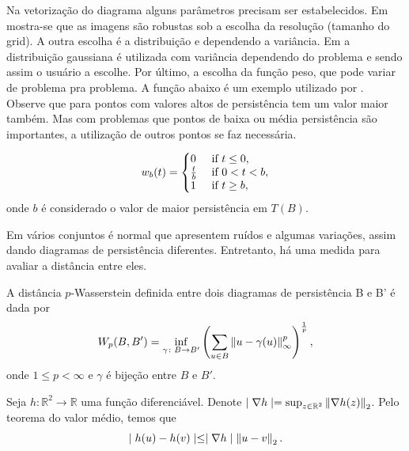Na vetorização do diagrama alguns parâmetros precisam ser estabelecidos. Em \cite{Adams2017} mostra-se que
as imagens são robustas sob a escolha da resolução (tamanho do grid). A outra escolha é a distribuição e dependendo
a variância. Em \cite{Adams2017} a distribuição gaussiana é utilizada com variância dependendo do problema e 
sendo assim o usuário a escolhe. Por último, a escolha da função peso, que pode variar de problema pra problema.
A função abaixo é um exemplo utilizado por \cite{Adams2017}. Observe que para pontos com valores altos de 
persistência tem um valor maior também. Mas com problemas que pontos de baixa ou média persistência são importantes,
a utilização de outros pontos se faz necessária. 

\begin{equation}\label{eq:weightfunct}
    w_b(t) = \left\{
             \begin{array}{@{}ll@{}} 
                 0           & \text{ if } t \leq 0, \\
                 \frac{t}{b} & \text{ if } 0 < t < b, \\
                 1           & \text{ if } t \geq b, 
             \end{array}\right.
\end{equation}
onde $b$ é considerado o valor de maior persistência em $T(B)$.

Em vários conjuntos é normal que apresentem ruídos e algumas variações, assim dando diagramas de persistência
diferentes. Entretanto, há uma medida para avaliar a distância entre eles. 
\begin{defi}
    A distância $p$-Wasserstein definida entre dois diagramas de persistência B e B' é dada por 
    \begin{equation*}
        W_p(B,B') = \inf_{\gamma\colon B \to B'} \left( \sum_{u\in B} \left\lVert u - \gamma(u)\right\rVert_{\infty}^{p} 
                    \right)^\frac{1}{p},
    \end{equation*}
    onde $1 \leq p < \infty$ e $\gamma$ é bijeção entre $B$ e $B'$. 
\end{defi}

Seja $h\colon \mathbb{R}^2 \to \mathbb{R}$ uma função diferenciável. Denote 
$\mid \nabla h \mid = \sup_{z\in \mathbb{R}^2} \left\lVert\nabla h(z)\right\rVert_2$. Pelo teorema do valor médio, temos que 
\begin{equation}\label{eq:mean_val}
    \mid h(u) - h(v) \mid \leq \mid \nabla h \mid \left\lVert u-v\right\rVert_2.
\end{equation}

